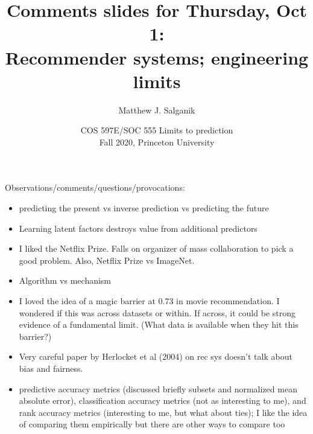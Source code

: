 \documentclass[aspectratio=169]{beamer}
\title[]{Comments slides for Thursday, Oct 1:\\Recommender systems; engineering limits}
\author[]{Matthew J. Salganik}
\institute[]{}
\date[]{COS 597E/SOC 555 Limits to prediction\\Fall 2020, Princeton University}
\begin{document}
\frame{\titlepage}
\begin{frame}
\frametitle{}

Observations/comments/questions/provocations:
\begin{itemize}
\item predicting the present vs inverse prediction vs predicting the future
\pause
\item Learning latent factors destroys value from additional predictors
\pause
\item I liked the Netflix Prize.  Falls on organizer of mass collaboration to pick a good problem. Also, Netflix Prize vs ImageNet.
\pause
\item Algorithm vs mechanism
\end{itemize}

\end{frame}
\begin{frame}

\begin{itemize}
\item I loved the idea of a magic barrier at 0.73 in movie recommendation.  I wondered if this was across datasets or within. If across, it could be strong evidence of a fundamental limit. (What data is available when they hit this barrier?)
\pause
\item Very careful paper by Herlocket et al (2004) on rec sys doesn't talk about bias and fairness.
\pause
\item predictive accuracy metrics (discussed briefly subsets and normalized mean absolute error), classification accuracy metrics (not as interesting to me), and rank accuracy metrics (interesting to me, but what about ties); I like the idea of comparing them empirically but there are other ways to compare too
\end{itemize}

\end{frame}
\end{document}
